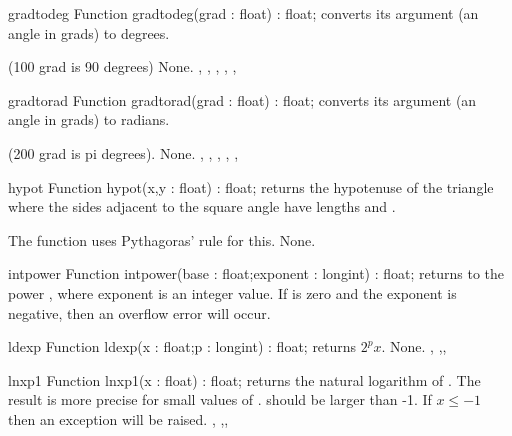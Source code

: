 \begin{function}{gradtodeg}
\Declaration
Function gradtodeg(grad : float) : float;
\Description
{} converts its argument  (an angle in grads)
to degrees.

(100 grad is 90 degrees)
\Errors
None.
\SeeAlso
{}, , ,
, , 
\end{function}



\begin{function}{gradtorad}
\Declaration
Function gradtorad(grad : float) : float;
\Description
{} converts its argument  (an angle in grads)
to radians.

(200 grad is pi degrees).
\Errors
None.
\SeeAlso
{}, , ,
, , 
\end{function}



\begin{function}{hypot}
\Declaration
Function hypot(x,y : float) : float;
\Description
{} returns the hypotenuse of the triangle where the sides
adjacent to the square angle have lengths  and .

The function uses Pythagoras' rule for this.
\Errors
None.
\SeeAlso
\end{function}



\begin{function}{intpower}
\Declaration
Function intpower(base : float;exponent : longint) : float;
\Description
{} returns  to the power ,
where exponent is an integer value.
\Errors
If  is zero and the exponent is negative, then an
overflow error will occur.
\SeeAlso
{}
\end{function}



\begin{function}{ldexp}
\Declaration
Function ldexp(x : float;p : longint) : float;
\Description
{} returns $2^p x$.
\Errors
None.
\SeeAlso
{}, ,,
\end{function}



\begin{function}{lnxp1}
\Declaration
Function lnxp1(x : float) : float;
\Description
{} returns the natural logarithm of . The result
is more precise for small values of .  should be larger
than -1.
\Errors
If $x\leq -1$ then an  exception will be raised.
\SeeAlso
{}, ,,
\end{function}

